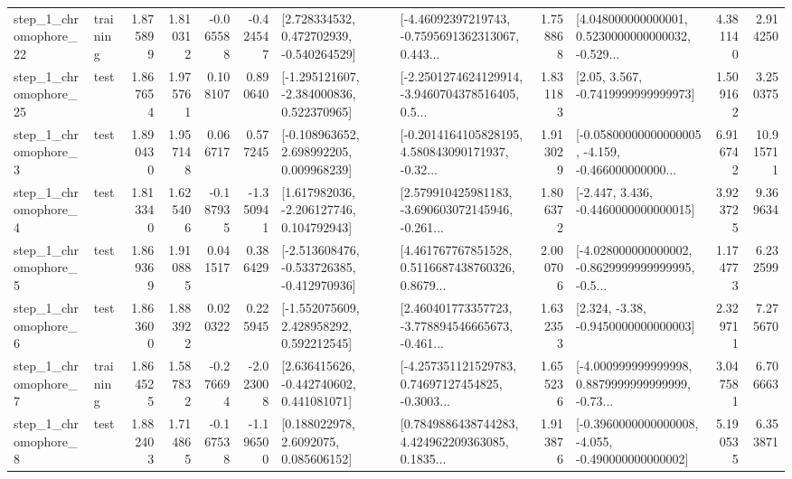 \begin{tabular}{llrrrrllrlrr}
    step\_1\_chromophore\_22 &  training &      1.875899 &    1.810312 &     -0.065588 & -0.424547 &    [2.728334532, 0.472702939, -0.540264529] &  [-4.46092397219743, -0.7595691362313067, 0.443... &       1.758868 &  [4.048000000000001, 0.5230000000000032, -0.529... &            4.381140 &          2.914250 \\
    step\_1\_chromophore\_25 &      test &      1.867654 &    1.975761 &      0.108107 &  0.890640 &   [-1.295121607, -2.384000836, 0.522370965] &  [-2.2501274624129914, -3.9460704378516405, 0.5... &       1.831183 &                 [2.05, 3.567, -0.7419999999999973] &            1.509162 &          3.250375 \\
     step\_1\_chromophore\_3 &      test &      1.890430 &    1.957148 &      0.066717 &  0.577245 &    [-0.108963652, 2.698992205, 0.009968239] &  [-0.2014164105828195, 4.580843090171937, -0.32... &       1.913029 &  [-0.05800000000000005, -4.159, -0.466000000000... &            6.916742 &         10.915711 \\
     step\_1\_chromophore\_4 &      test &      1.813340 &    1.625406 &     -0.187935 & -1.350941 &    [1.617982036, -2.206127746, 0.104792943] &  [2.579910425981183, -3.690603072145946, -0.261... &       1.806372 &               [-2.447, 3.436, -0.4460000000000015] &            3.923725 &          9.369634 \\
     step\_1\_chromophore\_5 &      test &      1.869369 &    1.910885 &      0.041517 &  0.386429 &  [-2.513608476, -0.533726385, -0.412970936] &  [4.461767767851528, 0.5116687438760326, 0.8679... &       2.000706 &  [-4.028000000000002, -0.8629999999999995, -0.5... &            1.174773 &          6.232599 \\
     step\_1\_chromophore\_6 &      test &      1.863600 &    1.883922 &      0.020322 &  0.225945 &    [-1.552075609, 2.428958292, 0.592212545] &  [2.460401773357723, -3.778894546665673, -0.461... &       1.632353 &                [2.324, -3.38, -0.9450000000000003] &            2.329711 &          7.275670 \\
     step\_1\_chromophore\_7 &  training &      1.864525 &    1.587832 &     -0.276694 & -2.023008 &    [2.636415626, -0.442740602, 0.441081071] &  [-4.257351121529783, 0.74697127454825, -0.3003... &       1.655236 &  [-4.000999999999998, 0.8879999999999999, -0.73... &            3.047581 &          6.706663 \\
     step\_1\_chromophore\_8 &      test &      1.882403 &    1.714865 &     -0.167538 & -1.196500 &       [0.188022978, 2.6092075, 0.085606152] &  [0.7849886438744283, 4.424962209363085, 0.1835... &       1.913876 &  [-0.3960000000000008, -4.055, -0.490000000000002] &            5.190535 &          6.353871 \\

\end{tabular}
